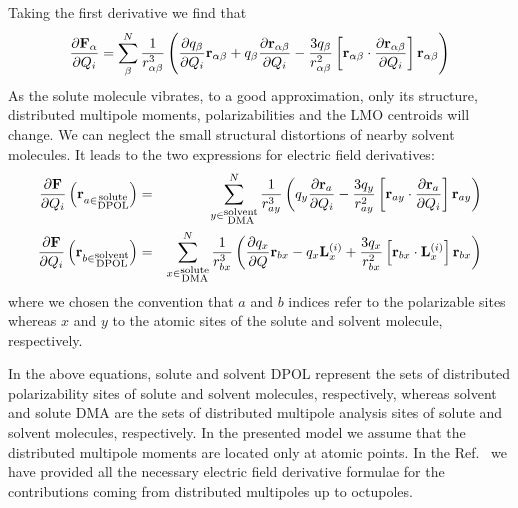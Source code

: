 \documentclass[a4paper,titlepage,twoside,fleqn,12pt]{book}
\newcommand{\fderiv}[2]{\ensuremath{
    \frac{\partial #1}{\partial #2}}}
\begin{document}
\begin{refsection}
%
Taking the first derivative we find that
%
\begin{equation}
\fderiv{{\bf F}_\alpha}{Q_i} = \sum_\beta^N \frac{1}{r_{\alpha\beta}^3}  
        \left(
            \fderiv{q_\beta}{Q_i}{\bf r}_{\alpha\beta} + q_\beta \fderiv{{\bf r}_{\alpha\beta}}{Q_i} - \frac{3q_\beta}{r_{\alpha\beta}^2} 
                \left[ 
                     {\bf r}_{\alpha\beta} \cdot \fderiv{{\bf r}_{\alpha\beta}}{Q_i} 
                \right] {\bf r}_{\alpha\beta}
        \right)
\end{equation}
%
As the solute molecule vibrates, to a good approximation, 
only its structure, distributed multipole moments, polarizabilities 
and the LMO centroids will change. We can neglect the small 
structural distortions of nearby solvent molecules. 
It leads to the two expressions for electric field derivatives:
%
\begin{eqnarray}
\fderiv{{\bf F}}{Q_i} \left({\bf r}_{a\in\substack{\text{solute}\\\text{DPOL}}} \right)
   &=& \sum_{y\in\substack{\text{solvent}\\\text{DMA}}}^N \frac{1}{r_{ay}^3}  
        \left(
                q_y \fderiv{{\bf r}_{a}}{Q_i} - \frac{3q_y}{r_{ay}^2} 
                \left[ 
                     {\bf r}_{ay} \cdot \fderiv{{\bf r}_{a}}{Q_i} 
                \right] {\bf r}_{ay}
        \right) \\
%
\fderiv{{\bf F}}{Q_i} \left({\bf r}_{b\in\substack{\text{solvent}\\\text{DPOL}}} \right)
    &=& \sum_{x\in\substack{\text{solute}\\\text{DMA}}}^N \frac{1}{r_{bx}^3}  
        \left(
            \fderiv{q_x}{Q}{\bf r}_{bx} - q_x {\bf L}_x^{(i)} + \frac{3q_x}{r_{bx}^2} 
                \left[ 
                     {\bf r}_{bx} \cdot {\bf L}_x^{(i)}
                \right] {\bf r}_{bx}
        \right)
\end{eqnarray}
%
where we chosen the convention that $a$ and $b$ indices refer to the 
polarizable sites whereas $x$ and $y$ to the atomic sites of the solute
and solvent molecule, respectively.

In the above equations, solute and solvent DPOL represent the sets 
of distributed polarizability sites of solute and solvent molecules, 
respectively, whereas solvent and solute DMA are the sets of distributed 
multipole analysis sites of solute and solvent molecules, respectively. 
In the presented model we assume that the distributed multipole moments are located only at atomic points.
In the Ref.~\citep{Blasiak.Cho.JCP.2014} we have provided all the 
necessary electric field derivative formulae for the contributions
coming from distributed multipoles up to octupoles. 


\end{refsection}
\end{document}
